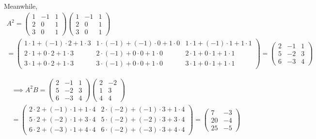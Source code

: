 \documentclass[a4paper, 10pt]{article}
\begin{document}
\begin{solution}
    Meanwhile,
    \begin{multline*}
        A^2 = \begin{pmatrix}
                1 & -1 & 1 \\
                2 & 0  & 1 \\
                3 & 0  & 1
            \end{pmatrix}\begin{pmatrix}
                1 & -1 & 1 \\
                2 & 0  & 1 \\
                3 & 0  & 1
            \end{pmatrix}
        \\
        = \begin{pmatrix}
                1 \cdot 1 + (-1) \cdot 2 + 1 \cdot 3 & 1 \cdot (-1) + (-1) \cdot 0 + 1 \cdot 0 & 1 \cdot 1 + (-1) \cdot 1 + 1 \cdot 1 \\
                2 \cdot 1 + 0 \cdot 2 + 1 \cdot 3    & 2 \cdot (-1) + 0 \cdot 0 + 1 \cdot 0    & 2 \cdot 1 + 0 \cdot 1 + 1 \cdot 1    \\
                3 \cdot 1 + 0 \cdot 2 + 1 \cdot 3    & 3 \cdot (-1) + 0 \cdot 0 + 1 \cdot 0    & 3 \cdot 1 + 0 \cdot 1 + 1 \cdot 1
            \end{pmatrix}
        = \begin{pmatrix}
                2 & -1 & 1 \\
                5 & -2 & 3 \\
                6 & -3 & 4
            \end{pmatrix}
    \end{multline*}

    \begin{multline*}
        \implies A^2B = \begin{pmatrix}
                2 & -1 & 1 \\
                5 & -2 & 3 \\
                6 & -3 & 4
            \end{pmatrix}\begin{pmatrix}
                2 & -2 \\
                1 & 3  \\
                4 & 4
            \end{pmatrix}
        \\
        = \begin{pmatrix}
                2 \cdot 2 + (-1) \cdot 1 + 1 \cdot 4 & 2 \cdot (-2) + (-1) \cdot 3 + 1 \cdot 4 \\
                5 \cdot 2 + (-2) \cdot 1 + 3 \cdot 4 & 5 \cdot (-2) + (-2) \cdot 3 + 3 \cdot 4 \\
                6 \cdot 2 + (-3) \cdot 1 + 4 \cdot 4 & 6 \cdot (-2) + (-3) \cdot 3 + 4 \cdot 4
            \end{pmatrix}
        = \begin{pmatrix}
                7  & -3 \\
                20 & -4 \\
                25 & -5
            \end{pmatrix}
    \end{multline*}


\end{solution}
\end{document}
